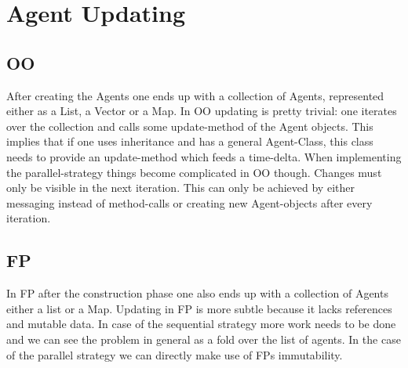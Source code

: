 \section{Agent Updating}
\subsection{OO}
After creating the Agents one ends up with a collection of Agents, represented either as a List, a Vector or a Map. In OO updating is pretty trivial: one iterates over the collection and calls some update-method of the Agent objects. This implies that if one uses inheritance and has a general Agent-Class, this class needs to provide an update-method which feeds a time-delta.
When implementing the parallel-strategy things become complicated in OO though. Changes must only be visible in the next iteration. This can only be achieved by either messaging instead of method-calls or creating new Agent-objects after every iteration.

\subsection{FP}
In FP after the construction phase one also ends up with a collection of Agents either a list or a Map. Updating in FP is more subtle because it lacks references and mutable data. In case of the sequential strategy more work needs to be done and we can see the problem in general as a fold over the list of agents. In the case of the parallel strategy we can directly make use of FPs immutability.